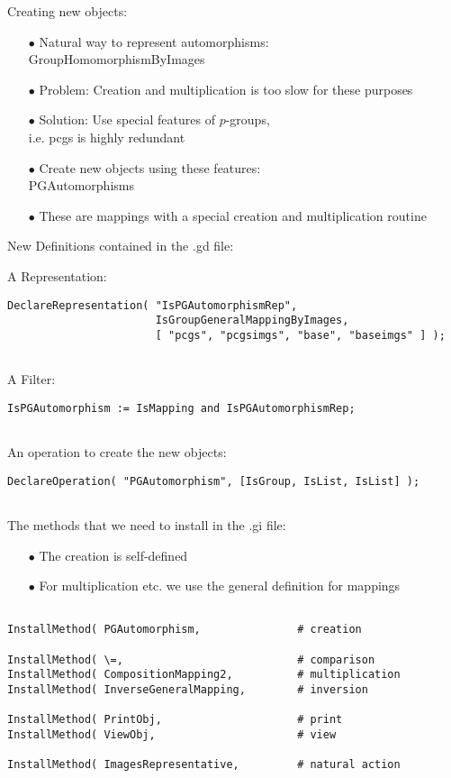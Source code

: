 \documentclass{slides}
\begin{document}
Creating new objects: 

\begin{itemize}
\item[$\bullet$] Natural way to represent automorphisms:\\
                 GroupHomomorphismByImages
\item[$\bullet$] Problem: Creation and multiplication is too slow for
                 these purposes
\item[$\bullet$] Solution: Use special features of $p$-groups, \\
                 i.e. pcgs is highly redundant
\item[$\bullet$] Create new objects using these features: \\
                 PGAutomorphisms
\item[$\bullet$] These are mappings with a special creation and 
                 multiplication routine
\end{itemize}
\newpage

New Definitions contained in the  .gd file:

A Representation:
{\tiny
\begin{verbatim}
DeclareRepresentation( "IsPGAutomorphismRep",
                       IsGroupGeneralMappingByImages,
                       [ "pcgs", "pcgsimgs", "base", "baseimgs" ] );


\end{verbatim}}

A Filter:
{\tiny
\begin{verbatim}
IsPGAutomorphism := IsMapping and IsPGAutomorphismRep;


\end{verbatim}}

An operation to create the new objects:
{\tiny
\begin{verbatim}
DeclareOperation( "PGAutomorphism", [IsGroup, IsList, IsList] );


\end{verbatim}}
\newpage

The methods that we need to install in the .gi file:

\begin{itemize}
\item[$\bullet$] The creation is self-defined
\item[$\bullet$] For multiplication etc. we use the general definition
                 for mappings
\end{itemize}

{\tiny
\begin{verbatim}

InstallMethod( PGAutomorphism,               # creation 

InstallMethod( \=,                           # comparison 
InstallMethod( CompositionMapping2,          # multiplication
InstallMethod( InverseGeneralMapping,        # inversion

InstallMethod( PrintObj,                     # print
InstallMethod( ViewObj,                      # view

InstallMethod( ImagesRepresentative,         # natural action
\end{verbatim}}
\end{document}
